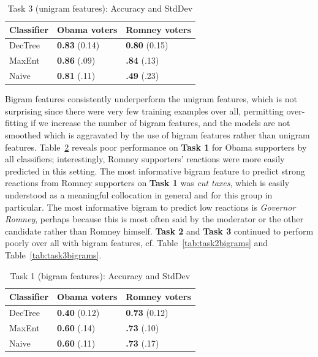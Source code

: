 \begin{table}[]
\begin{centering}
\begin{tabular}{ l | l | l }
Classifier & Obama voters & Romney voters \\
\hline
DecTree & \textbf{0.83} (0.14) &  \textbf{0.80} (0.15) \\
MaxEnt & \textbf{0.86} (.09) &  \textbf{.84} (.13) \\
Naive & \textbf{0.81} (.11) &  \textbf{.49} (.23) \\
\end{tabular}
\caption{Task 3 (unigram features): Accuracy and StdDev}
\label{tab:task3unigrams}
\end{centering}
\end{table}

Bigram features consistently underperform the unigram features, which is not surprising since there were very few training examples over all, permitting over-fitting if we increase the number of bigram features, and the models are not smoothed which is aggravated by the use of bigram features rather than unigram features.  Table~\ref{tab:task1bigrams} reveals poor performance on \textbf{Task 1} for Obama supporters by all classifiers; interestingly, Romney supporters' reactions were more easily predicted in this setting.  The most informative bigram feature to predict strong reactions from Romney supporters on \textbf{Task 1} was \emph{cut taxes}, which is easily understood as a meaningful collocation in general and for this group in particular. The most informative bigram to predict low reactions is \emph{Governor Romney}, perhaps because this is most often said by the moderator or the other candidate rather than Romney himself.  \textbf{Task 2} and \textbf{Task 3} continued to perform poorly over all with bigram features, cf. Table~\ref{tab:task2bigrams} and Table~\ref{tab:task3bigrams}.

\begin{table}[H]
\begin{centering}
\begin{tabular}{ l | l | l }
Classifier & Obama voters & Romney voters \\
\hline
DecTree & \textbf{0.40} (0.12) &  \textbf{0.73} (0.12) \\
MaxEnt & \textbf{0.60} (.14) &  \textbf{.73} (.10) \\
Naive & \textbf{0.60} (.11) &  \textbf{.73} (.17) \\
\end{tabular}
\caption{Task 1 (bigram features): Accuracy and StdDev}
\label{tab:task1bigrams}
\end{centering}
\end{table}

